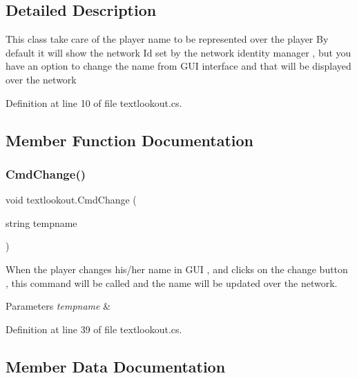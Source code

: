 \subsection{Detailed Description}
This class take care of the player name to be represented over the player By default it will show the network Id set by the network identity manager , but you have an option to change the name from G\+UI interface and that will be displayed over the network 



Definition at line 10 of file textlookout.\+cs.



\subsection{Member Function Documentation}
\mbox{\label{classtextlookout_a87df2200dcf8cff836c4dac438d103a9}} 
\subsubsection{\texorpdfstring{CmdChange()}{CmdChange()}}
{\footnotesize\ttfamily void textlookout.\+Cmd\+Change (\begin{DoxyParamCaption}\item[{string}]{tempname }\end{DoxyParamCaption})}



When the player changes his/her name in G\+UI , and clicks on the change button , this command will be called and the name will be updated over the network. 


\begin{DoxyParams}{Parameters}
{\em tempname} & \\
\hline
\end{DoxyParams}


Definition at line 39 of file textlookout.\+cs.



\subsection{Member Data Documentation}
\mbox{\label{classtextlookout_a09639adaa974a89468fab81266391bfd}} 
